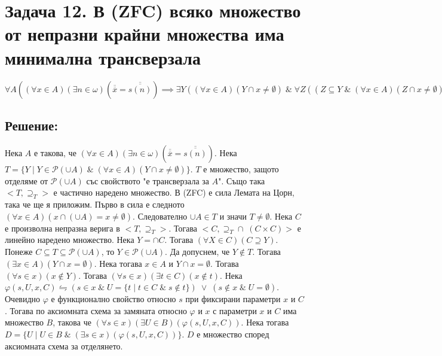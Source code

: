 \documentclass[12pt]{article}
\begin{document}
\section*{Задача 12. В (ZFC) всяко множество от непразни крайни множества има минимална трансверзала}
\(\forall A ((\forall x \in A)(\exists n \in \omega)(\overline{\overline{x}} = \overline{\overline{s(n)}}) \implies \exists Y ((\forall x \in A)(Y \cap x \neq \emptyset) \; \& \; \forall Z ((Z \subseteq Y \; \& \; (\forall x \in A)(Z \cap x \neq \emptyset)) \implies Z = Y)))\)

\subsection*{Решение:}
Нека \(A\) е такова, че \((\forall x \in A)(\exists n \in \omega)(\overline{\overline{x}} = \overline{\overline{s(n)}})\).
Нека \\
\(T = \{Y \; | \; Y \in \mathcal{P}(\cup A) \; \& \; (\forall x \in A)(Y \cap x \neq \emptyset)\}\).
\(T\) е множество, защото отделяме от \(\mathcal{P}(\cup A)\) със свойството "е трансверзала за \(A\)". Също така \(<T, \supseteq_T>\) е частично наредено множество.
В (ZFC) е сила Лемата на Цорн, така че ще я приложим.
Първо в сила е следното \((\forall x \in A)(x \cap (\cup A) = x \neq \emptyset)\).
Следователно \(\cup A \in T\) и значи \(T \neq \emptyset\).
Нека \(C\) е произволна непразна верига в \(<T, \supseteq_T>\).
Тогава \(<C, \supseteq_T\cap \; (C \times C)>\) е линейно наредено множество.
Нека \(Y = \cap C\). Тогава \((\forall X \in C)(C \supseteq Y)\).
Понеже \(C \subseteq T \subseteq \mathcal{P}(\cup A)\), то \(Y \in \mathcal{P}(\cup A)\).
Да допуснем, че \(Y \notin T\). Тогава \\
\((\exists x \in A)(Y \cap x = \emptyset)\).
Нека тогава \(x \in A\) и \(Y \cap x = \emptyset\).
Тогава \\
\((\forall s \in x)(x \notin Y)\).
Тогава \((\forall s \in x)(\exists t \in C)(x \notin t)\).
Нека \\
\(\varphi(s, U, x, C) \leftrightharpoons (s \in x \; \& \; U = \{t \; | \; t \in C \; \& \; s \notin t \}) \; \lor \; (s \notin x \; \& \; U = \emptyset)\).
Очевидно \(\varphi\) е функционално свойство относно \(s\) при фиксирани параметри \(x\) и \(C\).
Тогава по аксиомната схема за замяната относно \(\varphi\) и \(x\) с параметри \(x\) и \(C\) има множество \(B\), такова че
\((\forall s \in x)(\exists U \in B)(\varphi(s, U, x, C))\).
Нека тогава \(D = \{U \; | \; U \in B \; \& \; (\exists s \in x)(\varphi(s, U, x, C))\}\). \(D\) е множество според аксиомната схема за отделянето.
\end{document}
